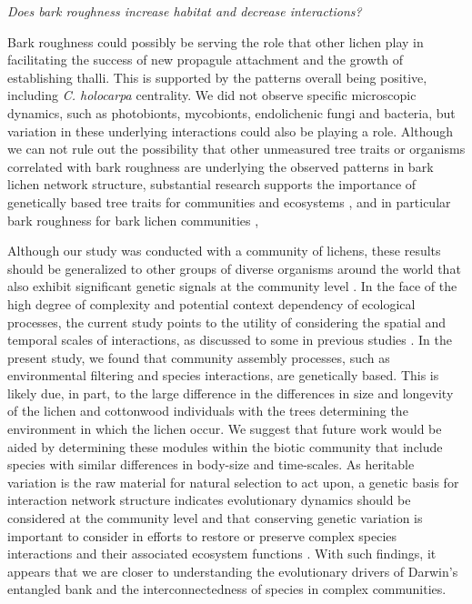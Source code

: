 \documentclass[11pt,twocolumn,twoside,lineno]{pnas-new}
\begin{document}
\textit{Does bark roughness increase habitat and decrease interactions?}



Bark roughness could possibly be serving the role that other lichen
play in facilitating the success of new propagule attachment and the
growth of establishing thalli. This is supported by the patterns
overall being positive, including \textit{C. holocarpa} centrality. We
did not observe specific microscopic dynamics, such as photobionts,
mycobionts, endolichenic fungi and bacteria, but variation in these
underlying interactions could also be playing a role. Although we can
not rule out the possibility that other unmeasured tree traits or
organisms correlated with bark roughness are underlying the observed
patterns in bark lichen network structure, substantial research
supports the importance of genetically based tree traits for
communities and ecosystems \cite{DesRoches2018TheVariation}, and in
particular bark roughness for bark lichen communities \cite{Bdeir2017,
  Lamit2011, Lamit2015a},





Although our study was conducted with a community of lichens, these
results should be generalized to other groups of diverse organisms
around the world that also exhibit significant genetic signals at the
community level \cite{Rowntree2011, Whitham2012}. In the face of the
high degree of complexity and potential context dependency of
ecological processes, the current study points to the utility of
considering the spatial and temporal scales of interactions, as
discussed to some in previous studies \cite{Bangert2006, Zook2010,
  Zytynska2012}. In the present study, we found that community
assembly processes, such as environmental filtering and species
interactions, are genetically based. This is likely due, in part, to
the large difference in the differences in size and longevity of the
lichen and cottonwood individuals with the trees determining the
environment in which the lichen occur. We suggest that future work
would be aided by determining these modules within the biotic
community that include species with similar differences in body-size
and time-scales. As heritable variation is the raw material for
natural selection to act upon, a genetic basis for interaction network
structure indicates evolutionary dynamics should be considered at the
community level and that conserving genetic variation is important to
consider in efforts to restore or preserve complex species
interactions and their associated ecosystem functions
\cite{Evans2013}.  With such findings, it appears that we are closer
to understanding the evolutionary drivers of Darwin's entangled bank
and the interconnectedness of species in complex communities.
\end{document}
